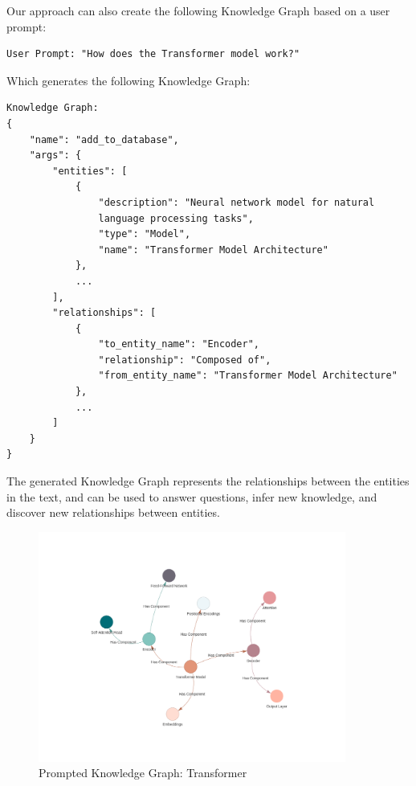 Our approach\cite{korigamikkg} can also
create the following Knowledge Graph based on a user prompt:

\begin{verbatim}
User Prompt: "How does the Transformer model work?"
\end{verbatim}

Which generates the following Knowledge Graph:

\begin{verbatim}
Knowledge Graph:
{
    "name": "add_to_database",
    "args": {
        "entities": [
            {
                "description": "Neural network model for natural 
                language processing tasks",
                "type": "Model",
                "name": "Transformer Model Architecture"
            },
            ...
        ],
        "relationships": [
            {
                "to_entity_name": "Encoder",
                "relationship": "Composed of",
                "from_entity_name": "Transformer Model Architecture"
            },
            ...
        ]
    }
}

\end{verbatim}


The generated Knowledge Graph represents the relationships between the entities in the text, and can be used to answer questions, infer new knowledge, and discover new relationships between entities.

\begin{figure}[h!]
    \centering
    \includegraphics[width=0.9\textwidth]{images/transformer.png}
    \caption{Prompted Knowledge Graph: Transformer}
    \label{fig:kg}
\end{figure}

